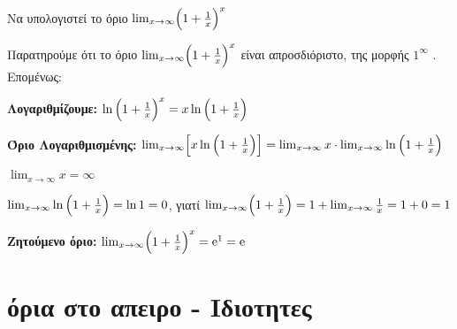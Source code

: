 \begin{example}
  Να υπολογιστεί το όριο $ \lim_{x \to \infty} \Bigl(1+ \frac{1}{x}\Bigr)^{x} $
\end{example}
\begin{solution}
  Παρατηρούμε ότι το όριο $ \lim_{x \to \infty} \Bigl(1+ \frac{1}{x}\Bigr)^{x} $ 
  είναι απροσδιόριστο, της μορφής $ 1^{\infty} $ . Επομένως:
  \begin{myitemize}
    \item \textbf{Λογαριθμίζουμε:} $ \ln{\Bigl(1+ \frac{1}{x}\Bigr)^{x}} = 
      x \ln{\Bigl(1 + \frac{1}{x}\Bigr)} $
    \item \textbf{Όριο Λογαριθμισμένης:} $ \lim_{x \to \infty}\Bigl[x \ln{\Bigl(1+
      \frac{1}{x}\Bigr)}\Bigr] = \lim_{x \to \infty} x \cdot \lim_{x \to \infty} 
      \ln{\Bigl(1+ \frac{1}{x}\Bigr)}$
      \begin{myitemize}
        \item $ \lim_{x \to \infty} x = \infty $
        \item $ \lim_{x \to \infty} \ln{\Bigl(1+ \frac{1}{x}\Bigr)} = \ln{1} = 0 $, 
          γιατί $ \lim_{x \to \infty} \Bigl(1+ \frac{1}{x}\Bigr) = 
          1 + \lim_{x \to \infty} \frac{1}{x} = 1+0=1 $
      \end{myitemize}
    \item \textbf{Ζητούμενο όριο:} $ \lim_{x \to \infty} 
      \Bigl(1+ \frac{1}{x}\Bigr)^{x} = \mathrm{e}^{1} = \mathrm{e} $
  \end{myitemize}    
\end{solution}


\section*{όρια στο απειρο - Ιδιοτητες}


